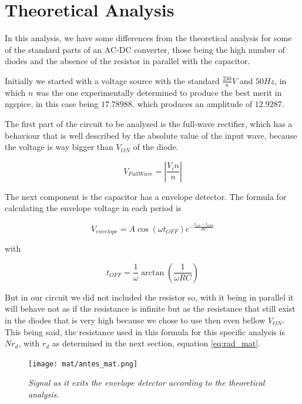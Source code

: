 \section{Theoretical Analysis}

In this analysis, we have some differences from the theoretical analysis for some of the standard parts of an AC-DC converter, those being the high number of diodes and the absence of the resistor in parallel with the capacitor.

Initially we started with a voltage source with the standard $\frac{230}{n}V$ and $50Hz$, in which $n$ was the one experimentally determined to produce the best merit in ngspice, in this case being $17.78988$, which produces an amplitude of $12.9287$.

The first part of the circuit to be analysed is the full-wave rectifier, which has a behaviour that is well described by the absolute value of the input wave, because the voltage is way bigger than $V_{ON}$ of the diode.

\begin{equation}
    V_{Full Wave} = \left|\frac{V_in}{n}\right|
    \label{eq:fullwave_mat}
\end{equation}

The next component is the capacitor has a envelope detector. The formula for calculating the envelope voltage in each period is 

\begin{equation}
    V_{envelope}=A\cos{(\omega t_{OFF})}e^{-\frac{t_{ON}-t_{OFF}}{RC}}
\end{equation}

with 

\begin{equation}
    t_{OFF}=\frac{1}{\omega}\arctan\left(\frac{1}{\omega R C}\right)
\end{equation}

But in our circuit we did not included the resistor so, with it being in parallel it will behave not as if the resistance is infinite but as the resistance that still exist in the diodes that is very high because we chose to use then even bellow $V_{ON}$. This being said, the resistance used in this formula for this specific analysis is $N r_d$, with $r_d$ as determined in the next section, equation \eqref{eq:rad_mat}.

\begin{figure}[H]
    \centering
    \texttt{[image: mat/antes\_mat.png]}
        \caption{\textit{Signal as it exits the envelope detector according to the theoretical analysis.}}
    \label{fig:plot6}
\end{figure}

